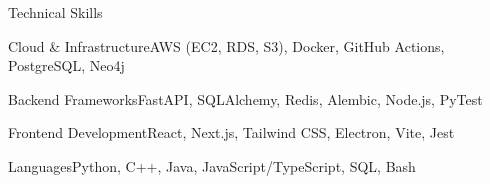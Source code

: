 \documentclass[
	11pt
]{../resume}
\begin{document}
	\begin{rSection}{T}{echnical Skills}
		\begin{rSet}{Cloud \& Infrastructure}{AWS (EC2, RDS, S3), Docker, GitHub Actions, PostgreSQL, Neo4j}
		\end{rSet}
		\begin{rSet}{Backend Frameworks}{FastAPI, SQLAlchemy, Redis, Alembic, Node.js, PyTest}
		\end{rSet}
		\begin{rSet}{Frontend Development}{React, Next.js, Tailwind CSS, Electron, Vite, Jest}
		\end{rSet}
		\begin{rSet}{Languages}{Python, C++, Java, JavaScript/TypeScript, SQL, Bash}
		\end{rSet}
	\end{rSection}
\end{document}
